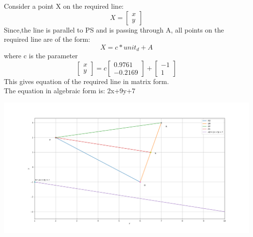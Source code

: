 \documentclass{beamer}
\begin{document}
\begin{frame}
Consider a point X on the required line:
\[
X=
\begin{bmatrix}
x\\
y
\end{bmatrix}
\]
Since,the line is parallel to PS and is passing through A,
all points on the required line are of the form:
\[
X=c*unit_d + A
\]
where c is the parameter
\[
\begin{bmatrix}
x\\
y
\end{bmatrix}
=c
\begin{bmatrix}
0.9761\\
-0.2169
\end{bmatrix}
+
\begin{bmatrix}
-1\\
1
\end{bmatrix}
\]
This gives equation of the required line in matrix form.\\
The equation in algebraic form is: 2x+9y+7
\end{frame}

\begin{frame}
 \includegraphics[scale=0.22]{Fig_triangle.png}
\end{frame}
\end{document}

